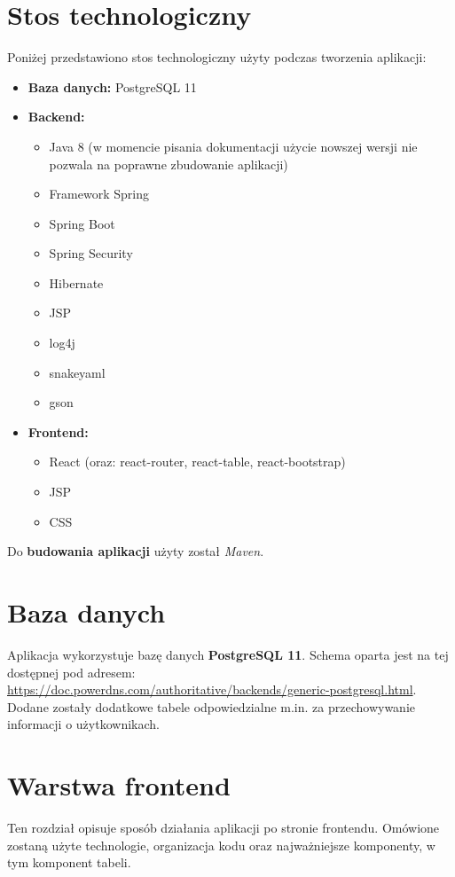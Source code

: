 \documentclass[11pt]{article}
\begin{document}
\section{Stos technologiczny}
Poniżej przedstawiono stos technologiczny użyty podczas tworzenia aplikacji:
\begin{itemize}
\item \textbf{Baza danych:} PostgreSQL 11
\item \textbf{Backend:}
\begin{itemize}
\item Java 8 (w momencie pisania dokumentacji użycie nowszej wersji nie pozwala na poprawne zbudowanie aplikacji)
\item Framework Spring
\item Spring Boot
\item Spring Security
\item Hibernate
\item JSP
\item log4j
\item snakeyaml
\item gson
\end{itemize}
\item \textbf{Frontend:}
\begin{itemize}
\item React (oraz: react-router, react-table, react-bootstrap)
\item JSP
\item CSS
\end{itemize}
\end{itemize}
Do \textbf{budowania aplikacji} użyty został \emph{Maven}.

\section{Baza danych}
Aplikacja wykorzystuje bazę danych \textbf{PostgreSQL 11}. Schema oparta jest na tej dostępnej pod adresem: \url{https://doc.powerdns.com/authoritative/backends/generic-postgresql.html}. Dodane zostały dodatkowe tabele odpowiedzialne m.in. za przechowywanie informacji o użytkownikach.


\section{Warstwa frontend}
Ten rozdział opisuje sposób działania aplikacji po stronie frontendu. Omówione zostaną użyte technologie, organizacja kodu oraz najważniejsze komponenty, w tym komponent tabeli.
\end{document}
